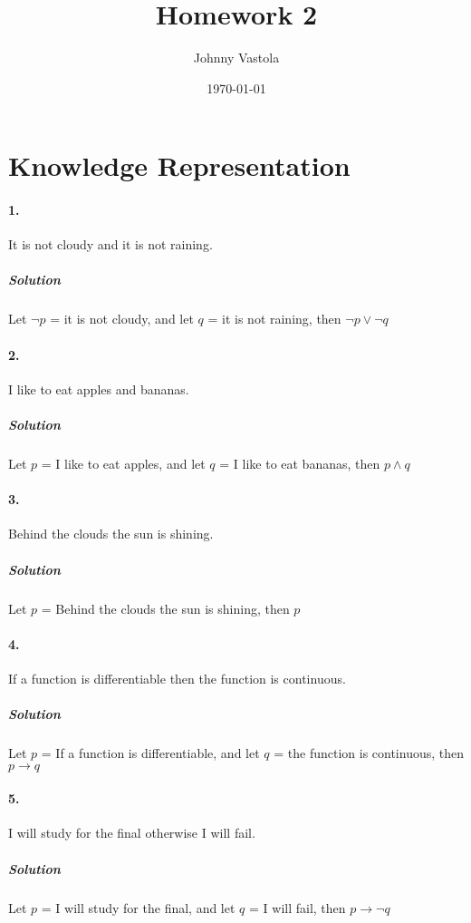 \documentclass[12pt]{article}
\title{Homework 2}
\author{Johnny Vastola}
\date{\today}
\begin{document}
\maketitle
\section{Knowledge Representation}
\paragraph{1.}
It is not cloudy and it is not raining.

\subparagraph{Solution}
Let $\neg p$ = it is not cloudy, and let $q$ = it is not raining, then $\neg p \lor \neg q$

\paragraph{2.}  I like to eat apples and bananas.
\subparagraph{Solution}
Let $p$ = I like to eat apples, and let $q$ = I like to eat bananas, then $p \land q$

\paragraph{3.} Behind the clouds the sun is shining.
\subparagraph{Solution}
Let $p$ = Behind the clouds the sun is shining, then $p$

\paragraph{4.} If a function is differentiable then the function is continuous.
\subparagraph{Solution}
Let $p$ = If a function is differentiable, and let $q$ = the function is continuous, then $p \rightarrow q$

\paragraph{5.} I will study for the final otherwise I will fail.
\subparagraph{Solution}
Let $p$ = I will study for the final, and let $q$ = I will fail, then $p \rightarrow \neg  q$
\end{document}
